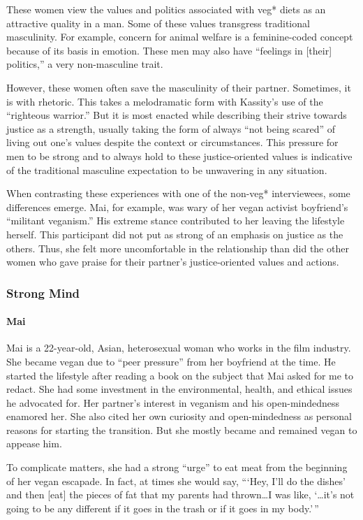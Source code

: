 \documentclass[twoside]{report}
\begin{document}
These women view the values and politics associated with veg* diets as
an attractive quality in a man. Some of these values transgress
traditional masculinity. For example, concern for animal welfare is a
feminine-coded concept because of its basis in emotion. These men may
also have ``feelings in {[}their{]} politics,'' a very non-masculine
trait.

However, these women often save the masculinity of their partner.
Sometimes, it is with rhetoric. This takes a melodramatic form with
Kassity's use of the ``righteous warrior.'' But it is most enacted while
describing their strive towards justice as a strength, usually taking
the form of always ``not being scared'' of living out one's values
despite the context or circumstances. This pressure for men to be strong
and to always hold to these justice-oriented values is indicative of the
traditional masculine expectation to be unwavering in any situation.

When contrasting these experiences with one of the non-veg*
interviewees, some differences emerge. Mai, for example, was wary of her
vegan activist boyfriend's ``militant veganism.'' His extreme stance
contributed to her leaving the lifestyle herself. This participant did not put
as strong of an emphasis on justice as the others. Thus, she
felt more uncomfortable in the relationship than did the other women who
gave praise for their partner's justice-oriented values and actions.

\subsubsection{Strong Mind}

\paragraph{Mai}

Mai is a 22-year-old, Asian, heterosexual woman who works in the film
industry. She became vegan due to ``peer pressure'' from her boyfriend
at the time. He started the lifestyle after reading a book on the subject that Mai asked for me to redact. She had some investment in the environmental, health, and ethical issues he advocated for. Her partner's interest in veganism and his open-mindedness enamored her. She also cited her own curiosity and open-mindedness as personal reasons
for starting the transition. But she mostly became and remained vegan to appease him. 

To complicate matters, she had a strong ``urge'' to eat meat from the beginning of her vegan escapade. In fact, at times she would say, ```Hey, I'll do the dishes' and then {[}eat{]} the pieces of fat that my parents had thrown\ldots{}I was like, `\ldots it's not going to be any different if
it goes in the trash or if it goes in my body.'\,''
\end{document}
